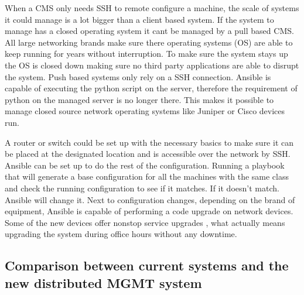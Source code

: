 When a CMS only needs SSH to remote configure a machine, the scale of systems it could manage is a lot bigger than a client based system. If the system to manage has a closed operating system it cant be managed by a pull based CMS. All large networking brands make sure there operating systems (OS) are able to keep running for years without interruption. To make sure the system stays up the OS is closed down making sure no third party applications are able to disrupt the system. Push based systems only rely on a SSH connection. Ansible is capable of executing the python script on the server, therefore the requirement of python on the managed server is no longer there. This makes it possible to manage closed source network operating systems like Juniper or Cisco devices run. 

A router or switch could be set up with the necessary basics to make sure it can be placed at the designated location and is accessible over the network by SSH. Ansible can be set up to do the rest of the configuration. Running a playbook that will generate a base configuration for all the machines with the same class and check the running configuration to see if it matches. If it doesn't match. Ansible will change it. Next to configuration changes, depending on the brand of equipment, Ansible is capable of performing a code upgrade on network devices. Some of the new devices offer nonstop service upgrades \cite{NSSU}\cite{ISSU}, what actually means upgrading the system during office hours without any downtime.  

\subsection{Comparison between current systems and the new distributed MGMT system}\label{subsec:distributedmgmt}
